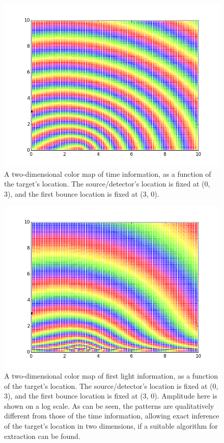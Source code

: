 \documentclass[11pt]{article}
\begin{document}
\begin{figure} 
\begin{center} 
\includegraphics[scale=0.4]{light_diagram_first_time_prism.png} 
\caption{A two-dimensional color map of time information, as a function of the target's location. The source/detector's location is fixed at (0, 3), and the first bounce location is fixed at (3, 0).} 
\end{center} 
\end{figure}

\begin{figure} 
\begin{center} 
\includegraphics[scale=0.4]{light_diagram_first_prism.png} 
\caption{A two-dimensional color map of first light information, as a function of the target's location. The source/detector's location is fixed at (0, 3), and the first bounce location is fixed at (3, 0). Amplitude here is shown on a log scale. As can be seen, the patterns are qualitatively different from those of the time information, allowing exact inference of the target's location in two dimensions, if a suitable algorithm for extraction can be found.} 
\end{center} 
\end{figure}
\end{document}

